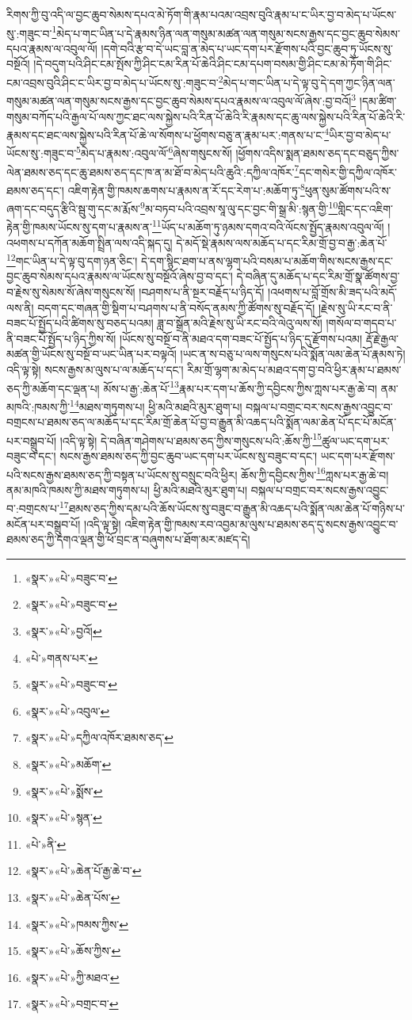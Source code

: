 རིགས་ཀྱི་བུ་འདི་ལ་བྱང་ཆུབ་སེམས་དཔའ་མེ་ཏོག་གི་རྣམ་པའམ་འབྲས་བུའི་རྣམ་པ་ང་ཡིར་བྱ་བ་མེད་པ་ཡོངས་སུ་:གཟུང་བ་\footnote{«སྣར་»«པེ་»བཟུང་བ་}མེད་པ་གང་ཡིན་པ་དེ་རྣམས་ཉིན་ལན་གསུམ་མཚན་ལན་གསུམ་སངས་རྒྱས་དང་བྱང་ཆུབ་སེམས་དཔའ་རྣམས་ལ་འབུལ་ལོ། །དགེ་བའི་རྩ་བ་དེ་ཡང་བླ་ན་མེད་པ་ཡང་དག་པར་རྫོགས་པའི་བྱང་ཆུབ་ཏུ་ཡོངས་སུ་བསྔོའོ། །དེ་བདུག་པའི་ཤིང་ངམ་སྤོས་ཀྱི་ཤིང་ངམ་རིན་པོ་ཆེའི་ཤིང་ངམ་དཔག་བསམ་གྱི་ཤིང་ངམ་མེ་ཏོག་གི་ཤིང་ངམ་འབྲས་བུའི་ཤིང་ང་ཡིར་བྱ་བ་མེད་པ་ཡོངས་སུ་:གཟུང་བ་\footnote{«སྣར་»«པེ་»བཟུང་བ་}མེད་པ་གང་ཡིན་པ་དེ་ལྟ་བུ་དེ་དག་ཀྱང་ཉིན་ལན་གསུམ་མཚན་ལན་གསུམ་སངས་རྒྱས་དང་བྱང་ཆུབ་སེམས་དཔའ་རྣམས་ལ་འབུལ་ལོ་ཞེས་:བྱ་བའོ།\footnote{«སྣར་»«པེ་»བྱའོ།} །དམ་ཚིག་གསུམ་བཀོད་པའི་རྒྱལ་པོ་ལས་ཀྱང་ཐང་ལས་སྐྱེས་པའི་རིན་པོ་ཆེའི་རི་རྣམས་དང་ཆུ་ལས་སྐྱེས་པའི་རིན་པོ་ཆེའི་རི་རྣམས་དང་ཐང་ལས་སྐྱེས་པའི་རིན་པོ་ཆེ་ལ་སོགས་པ་ཕྱོགས་བཅུ་ན་རྣམ་པར་:གནས་པ་ང་\footnote{«པེ་»གནས་པར་}ཡིར་བྱ་བ་མེད་པ་ཡོངས་སུ་:གཟུང་བ་\footnote{«སྣར་»«པེ་»བཟུང་བ་}མེད་པ་རྣམས་:འབུལ་ལོ་\footnote{«སྣར་»«པེ་»འབུལ་}ཞེས་གསུངས་སོ། །ཕྱོགས་འདིས་སྨན་ཐམས་ཅད་དང་བཅུད་ཀྱིས་ལེན་ཐམས་ཅད་དང་ཆུ་ཐམས་ཅད་དང་ཁ་ན་མ་ཐོ་བ་མེད་པའི་ཆུའི་:དཀྱིལ་འཁོར་\footnote{«སྣར་»«པེ་»དཀྱིལ་འཁོར་ཐམས་ཅད་}དང་གསེར་གྱི་དཀྱིལ་འཁོར་ཐམས་ཅད་དང་། འཇིག་རྟེན་གྱི་ཁམས་ཆགས་པ་རྣམས་ན་རོ་དང་རེག་པ་:མཆོག་ཏུ་\footnote{«སྣར་»«པེ་»མཆོག་}ཕུན་སུམ་ཚོགས་པའི་ས་ཞག་དང་བདུད་རྩིའི་སྦུ་གུ་དང་མ་རྨོས་\footnote{«སྣར་»«པེ་»སྨོས་}མ་བཏབ་པའི་འབྲས་སཱ་ལུ་དང་བྱང་གི་སྒྲ་མི་:སྙན་གྱི་\footnote{«སྣར་»«པེ་»སྙན་}གླིང་དང་འཇིག་རྟེན་གྱི་ཁམས་ཡོངས་སུ་དག་པ་རྣམས་ན་\footnote{«པེ་»ནི་}ཡོད་པ་མཆོག་ཏུ་ཉམས་དགའ་བའི་ལོངས་སྤྱོད་རྣམས་འབུལ་ལོ། །འཕགས་པ་དཀོན་མཆོག་སྤྲིན་ལས་འདི་སྐད་དུ། དེ་མདོ་སྡེ་རྣམས་ལས་མཆོད་པ་དང་རིམ་གྲོ་བྱ་བ་རྒྱ་:ཆེན་པོ་\footnote{«སྣར་»«པེ་»ཆེན་པོ་རྒྱ་ཆེ་བ་}གང་ཡིན་པ་དེ་ལྟ་བུ་དག་ཉན་ཅིང་། དེ་དག་སྙིང་ཐག་པ་ནས་ལྷག་པའི་བསམ་པ་མཆོག་གིས་སངས་རྒྱས་དང་བྱང་ཆུབ་སེམས་དཔའ་རྣམས་ལ་ཡོངས་སུ་བསྔོའོ་ཞེས་བྱ་བ་དང་། དེ་བཞིན་དུ་མཆོད་པ་དང་རིམ་གྲོ་སྣ་ཚོགས་བྱ་བ་རྗེས་སུ་སེམས་སོ་ཞེས་གསུངས་སོ། །བཤགས་པ་ནི་སྔར་བརྗོད་པ་ཉིད་དོ། །འཕགས་པ་བློ་གྲོས་མི་ཟད་པའི་མདོ་ལས་ནི། བདག་དང་གཞན་གྱི་སྡིག་པ་བཤགས་པ་ནི་བསོད་ནམས་ཀྱི་ཚོགས་སུ་བརྗོད་དོ། །རྗེས་སུ་ཡི་རང་བ་ནི་བཟང་པོ་སྤྱོད་པའི་ཚིགས་སུ་བཅད་པའམ། ཟླ་བ་སྒྲོན་མའི་རྗེས་སུ་ཡི་རང་བའི་ལེའུ་ལས་སོ། །གསོལ་བ་གདབ་པ་ནི་བཟང་པོ་སྤྱོད་པ་ཉིད་ཀྱིས་སོ། །ཡོངས་སུ་བསྔོ་བ་ནི་མཐའ་དག་བཟང་པོ་སྤྱོད་པ་ཉིད་དུ་རྫོགས་པའམ། རྡོ་རྗེ་རྒྱལ་མཚན་གྱི་ཡོངས་སུ་བསྔོ་བ་ཡང་ཡིན་པར་བལྟའོ། །ཡང་ན་ས་བཅུ་པ་ལས་གསུངས་པའི་སྨོན་ལམ་ཆེན་པོ་རྣམས་ཏེ། འདི་ལྟ་སྟེ། སངས་རྒྱས་མ་ལུས་པ་ལ་མཆོད་པ་དང་། རིམ་གྲོ་ལྷག་མ་མེད་པ་མཐའ་དག་བྱ་བའི་ཕྱིར་རྣམ་པ་ཐམས་ཅད་ཀྱི་མཆོག་དང་ལྡན་པ། མོས་པ་རྒྱ་:ཆེན་པོ་\footnote{«སྣར་»«པེ་»ཆེན་པོས་}རྣམ་པར་དག་པ་ཆོས་ཀྱི་དབྱིངས་ཀྱིས་ཀླས་པར་རྒྱ་ཆེ་བ། ནམ་མཁའི་:ཁམས་ཀྱི་\footnote{«སྣར་»«པེ་»ཁམས་ཀྱིས་}མཐས་གཏུགས་པ། ཕྱི་མའི་མཐའི་མུར་ཐུག་པ། བསྐལ་པ་བགྲང་བར་སངས་རྒྱས་འབྱུང་བ་བགྲངས་པ་ཐམས་ཅད་ལ་མཆོད་པ་དང་རིམ་གྲོ་ཆེན་པོ་བྱ་བ་རྒྱུན་མི་འཆད་པའི་སྨོན་ལམ་ཆེན་པོ་དང་པོ་མངོན་པར་བསྒྲུབ་པོ། །འདི་ལྟ་སྟེ། དེ་བཞིན་གཤེགས་པ་ཐམས་ཅད་ཀྱིས་གསུངས་པའི་:ཆོས་ཀྱི་\footnote{«སྣར་»«པེ་»ཆོས་ཀྱིས་}ཚུལ་ཡང་དག་པར་བཟུང་བ་དང་། སངས་རྒྱས་ཐམས་ཅད་ཀྱི་བྱང་ཆུབ་ཡང་དག་པར་ཡོངས་སུ་བཟུང་བ་དང་། ཡང་དག་པར་རྫོགས་པའི་སངས་རྒྱས་ཐམས་ཅད་ཀྱི་བསྟན་པ་ཡོངས་སུ་བསྲུང་བའི་ཕྱིར། ཆོས་ཀྱི་དབྱིངས་ཀྱིས་\footnote{«སྣར་»«པེ་»ཀྱི་མཐའ་}ཀླས་པར་རྒྱ་ཆེ་བ། ནམ་མཁའི་ཁམས་ཀྱི་མཐས་གཏུགས་པ། ཕྱི་མའི་མཐའི་མུར་ཐུག་པ། བསྐལ་པ་བགྲང་བར་སངས་རྒྱས་འབྱུང་བ་:བགྲངས་པ་\footnote{«སྣར་»«པེ་»བགྲང་བ་}ཐམས་ཅད་ཀྱིས་དམ་པའི་ཆོས་ཡོངས་སུ་བཟུང་བ་རྒྱུན་མི་འཆད་པའི་སྨོན་ལམ་ཆེན་པོ་གཉིས་པ་མངོན་པར་བསྒྲུབ་པོ། །འདི་ལྟ་སྟེ། འཇིག་རྟེན་གྱི་ཁམས་རབ་འབྱམ་མ་ལུས་པ་ཐམས་ཅད་དུ་སངས་རྒྱས་འབྱུང་བ་ཐམས་ཅད་ཀྱི་དགའ་ལྡན་གྱི་ཕོ་བྲང་ན་བཞུགས་པ་ཐོག་མར་མཛད་དེ། 